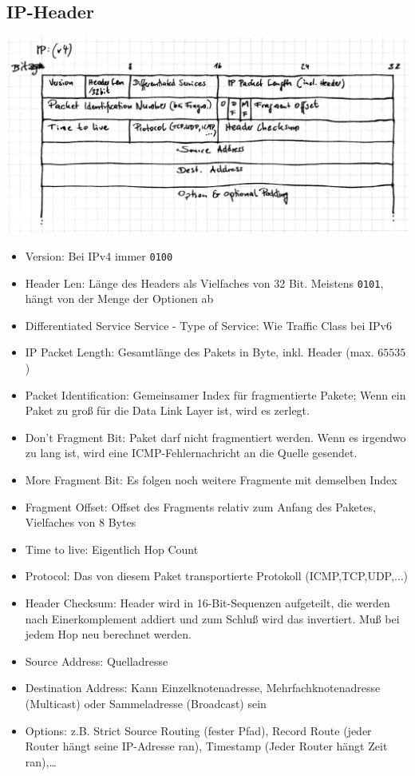 \documentclass[10pt,a4paper]{scrartcl}
\begin{document}
\subsection*{IP-Header}
\includegraphics[width=\textwidth]{ipheader.jpg}
\begin{itemize}
\item Version: Bei IPv4 immer \texttt{0100}
\item Header Len: Länge des Headers als Vielfaches von 32 Bit. Meistens \texttt{0101}, hängt von der Menge der Optionen ab
\item Differentiated Service Service - Type of Service: Wie Traffic Class bei IPv6
\item IP Packet Length: Gesamtlänge des Pakets in Byte, inkl. Header (max. $65535$)
\item Packet Identification: Gemeinsamer Index für fragmentierte Pakete; Wenn ein Paket zu groß für die Data Link Layer ist, wird es zerlegt. 
\item Don't Fragment Bit: Paket darf nicht fragmentiert werden. Wenn es irgendwo zu lang ist, wird eine ICMP-Fehlernachricht an die Quelle gesendet.
\item More Fragment Bit: Es folgen noch weitere Fragmente mit demselben Index
\item Fragment Offset: Offset des Fragments relativ zum Anfang des Paketes, Vielfaches von 8 Bytes
\item Time to live: Eigentlich Hop Count
\item Protocol: Das von diesem Paket transportierte Protokoll (ICMP,TCP,UDP,$\ldots$)
\item Header Checksum: Header wird in 16-Bit-Sequenzen aufgeteilt, die werden nach Einerkomplement addiert und zum Schluß wird das invertiert. Muß bei jedem Hop neu berechnet werden.
\item Source Address: Quelladresse
\item Destination Address: Kann Einzelknotenadresse, Mehrfachknotenadresse (Multicast) oder Sammeladresse (Broadcast) sein
\item Options: z.B. Strict Source Routing (fester Pfad), Record Route (jeder Router hängt seine IP-Adresse ran), Timestamp (Jeder Router hängt Zeit ran),\ldots
\end{itemize}
\end{document}
